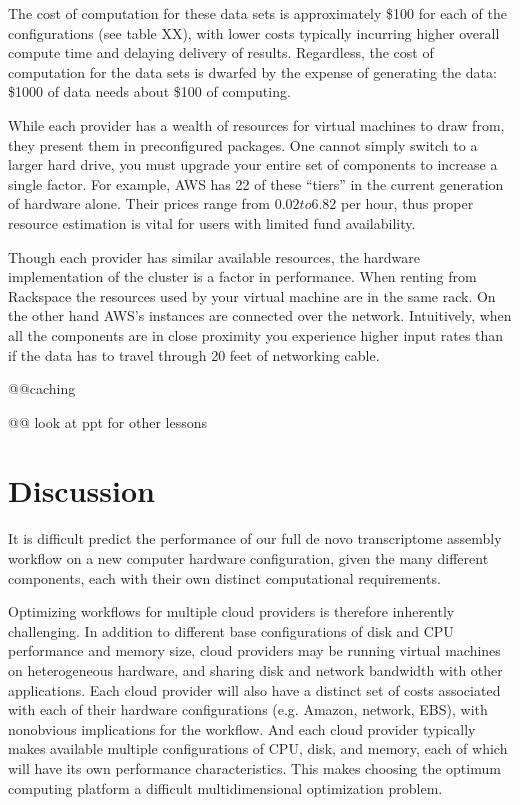 \documentclass[11pt]{article}
\begin{document}
The cost of computation for these data sets is approximately \$100 for
each of the configurations (see table XX), with lower costs typically
incurring higher overall compute time and delaying delivery of results.
Regardless, the cost of computation for the data sets is dwarfed by
the expense of generating the data: \$1000 of data needs about \$100
of computing.

While each provider has a wealth of resources for virtual machines to draw 
from, they present them in preconfigured packages. One cannot simply switch to
a larger hard drive, you must upgrade your entire set of components to 
increase a single factor. For example, AWS has 22 of these ``tiers'' in the 
current generation of hardware alone. Their prices range from $0.02 to $6.82
per hour, thus proper resource estimation is vital for users with limited fund
availability. 

Though each provider has similar available resources, the hardware
implementation of the cluster is a factor in performance. When renting from
Rackspace the resources used by your virtual machine are in the same rack. On
the other hand AWS’s instances are connected over the network. Intuitively,
when all the components are in close proximity you experience higher input
rates than if the data has to travel through 20 feet of networking cable.

@@caching

@@ look at ppt for other lessons

\section*{Discussion}

It is difficult predict the performance of our full de novo
transcriptome assembly workflow on a new computer hardware
configuration, given the many different components, each with
their own distinct computational requirements.  

Optimizing workflows for multiple cloud providers is therefore
inherently challenging.  In addition to different base configurations
of disk and CPU performance and memory size, cloud providers may be
running virtual machines on heterogeneous hardware, and sharing disk
and network bandwidth with other applications.  Each cloud provider
will also have a distinct set of costs associated with each of their
hardware configurations (e.g. Amazon, network, EBS), with nonobvious
implications for the workflow.  And each cloud provider typically
makes available multiple configurations of CPU, disk, and memory, each
of which will have its own performance characteristics.  This makes
choosing the optimum computing platform a difficult multidimensional
optimization problem.
\end{document}
